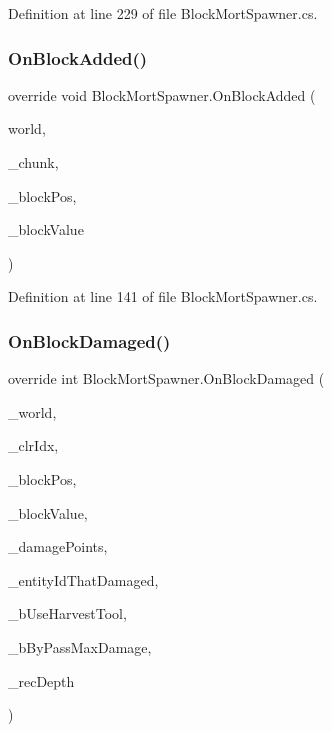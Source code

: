 Definition at line 229 of file Block\+Mort\+Spawner.\+cs.

\mbox{\label{class_block_mort_spawner_a63c8f9c1511233add803403b62dfe8d9}} 
\subsubsection{\texorpdfstring{OnBlockAdded()}{OnBlockAdded()}}
{\footnotesize\ttfamily override void Block\+Mort\+Spawner.\+On\+Block\+Added (\begin{DoxyParamCaption}\item[{World\+Base}]{world,  }\item[{Chunk}]{\+\_\+chunk,  }\item[{Vector3i}]{\+\_\+block\+Pos,  }\item[{Block\+Value}]{\+\_\+block\+Value }\end{DoxyParamCaption})}



Definition at line 141 of file Block\+Mort\+Spawner.\+cs.

\mbox{\label{class_block_mort_spawner_abca5a2081742c58e44dbb54331c623d7}} 
\subsubsection{\texorpdfstring{OnBlockDamaged()}{OnBlockDamaged()}}
{\footnotesize\ttfamily override int Block\+Mort\+Spawner.\+On\+Block\+Damaged (\begin{DoxyParamCaption}\item[{World\+Base}]{\+\_\+world,  }\item[{int}]{\+\_\+clr\+Idx,  }\item[{Vector3i}]{\+\_\+block\+Pos,  }\item[{Block\+Value}]{\+\_\+block\+Value,  }\item[{int}]{\+\_\+damage\+Points,  }\item[{int}]{\+\_\+entity\+Id\+That\+Damaged,  }\item[{bool}]{\+\_\+b\+Use\+Harvest\+Tool,  }\item[{bool}]{\+\_\+b\+By\+Pass\+Max\+Damage,  }\item[{int}]{\+\_\+rec\+Depth }\end{DoxyParamCaption})}



